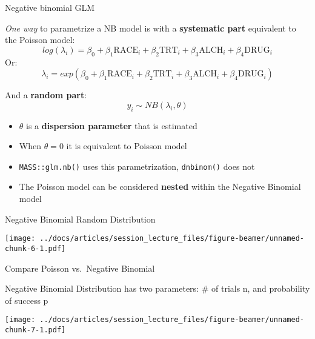 \documentclass[
  ignorenonframetext,
]{beamer}
\providecommand{\tightlist}{%
  \setlength{\itemsep}{0pt}\setlength{\parskip}{0pt}}
\begin{document}
\begin{frame}[fragile]{Negative binomial GLM}
\protect\hypertarget{negative-binomial-glm}{}

\emph{One way} to parametrize a NB model is with a \textbf{systematic
part} equivalent to the Poisson model: \[
log(\lambda_i) = \beta_0 + \beta_1 \textrm{RACE}_i + \beta_2 \textrm{TRT}_i + \beta_3 \textrm{ALCH}_i + \beta_4 \textrm{DRUG}_i
\] Or: \[
\lambda_i = exp \left( \beta_0 + \beta_1 \textrm{RACE}_i + \beta_2 \textrm{TRT}_i + \beta_3 \textrm{ALCH}_i + \beta_4 \textrm{DRUG}_i \right)
\]

And a \textbf{random part}: \[
y_i \sim NB(\lambda_i, \theta)
\]

\begin{itemize}
\tightlist
\item
  \(\theta\) is a \textbf{dispersion parameter} that is estimated
\item
  When \(\theta = 0\) it is equivalent to Poisson model
\item
  \texttt{MASS::glm.nb()} uses this parametrization, \texttt{dnbinom()}
  does not
\item
  The Poisson model can be considered \textbf{nested} within the
  Negative Binomial model
\end{itemize}

\end{frame}

\begin{frame}{Negative Binomial Random Distribution}
\protect\hypertarget{negative-binomial-random-distribution}{}

\texttt{[image: ../docs/articles/session\_lecture\_files/figure-beamer/unnamed-chunk-6-1.pdf]}

\end{frame}

\begin{frame}{Compare Poisson vs.~Negative Binomial}
\protect\hypertarget{compare-poisson-vs.-negative-binomial}{}

Negative Binomial Distribution has two parameters: \# of trials n, and
probability of success p

\texttt{[image: ../docs/articles/session\_lecture\_files/figure-beamer/unnamed-chunk-7-1.pdf]}

\end{frame}
\end{document}
